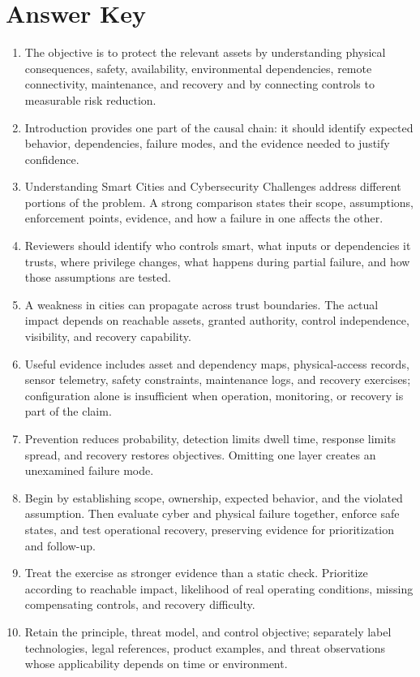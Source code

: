 \documentclass[11pt,letterpaper]{article}
\begin{document}
\section*{Answer Key}
\begin{enumerate}
\item The objective is to protect the relevant assets by understanding physical consequences, safety, availability, environmental dependencies, remote connectivity, maintenance, and recovery and by connecting controls to measurable risk reduction.
\item Introduction provides one part of the causal chain: it should identify expected behavior, dependencies, failure modes, and the evidence needed to justify confidence.
\item Understanding Smart Cities and Cybersecurity Challenges address different portions of the problem. A strong comparison states their scope, assumptions, enforcement points, evidence, and how a failure in one affects the other.
\item Reviewers should identify who controls smart, what inputs or dependencies it trusts, where privilege changes, what happens during partial failure, and how those assumptions are tested.
\item A weakness in cities can propagate across trust boundaries. The actual impact depends on reachable assets, granted authority, control independence, visibility, and recovery capability.
\item Useful evidence includes asset and dependency maps, physical-access records, sensor telemetry, safety constraints, maintenance logs, and recovery exercises; configuration alone is insufficient when operation, monitoring, or recovery is part of the claim.
\item Prevention reduces probability, detection limits dwell time, response limits spread, and recovery restores objectives. Omitting one layer creates an unexamined failure mode.
\item Begin by establishing scope, ownership, expected behavior, and the violated assumption. Then evaluate cyber and physical failure together, enforce safe states, and test operational recovery, preserving evidence for prioritization and follow-up.
\item Treat the exercise as stronger evidence than a static check. Prioritize according to reachable impact, likelihood of real operating conditions, missing compensating controls, and recovery difficulty.
\item Retain the principle, threat model, and control objective; separately label technologies, legal references, product examples, and threat observations whose applicability depends on time or environment.
\end{enumerate}
\end{document}
